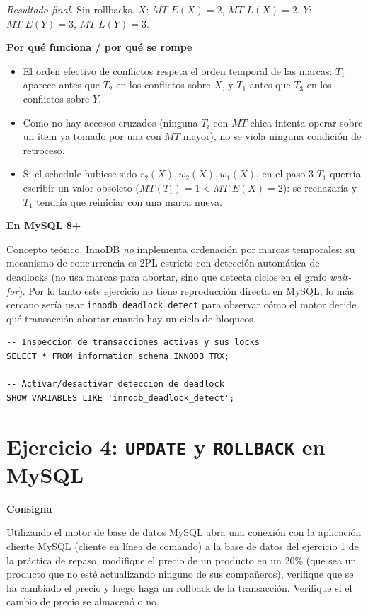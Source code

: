 \documentclass[11pt,a4paper]{article}
\newcommand{\itemcabecera}[1]{\noindent\textbf{#1}\par\medskip}
\newcommand{\bloqueConsigna}{\itemcabecera{Consigna}}
\newcommand{\bloquePorque}{\itemcabecera{Por qu\'e funciona / por qu\'e se rompe}}
\newcommand{\bloqueMySQL}{\itemcabecera{En MySQL 8+}}
\begin{document}
\textit{Resultado final.} Sin rollbacks. $X$: $MT\text{-}E(X) = 2$, $MT\text{-}L(X) = 2$. $Y$: $MT\text{-}E(Y) = 3$, $MT\text{-}L(Y) = 3$.

\bloquePorque

\begin{itemize}
    \item El orden efectivo de conflictos respeta el orden temporal de las marcas: $T_1$ aparece antes que $T_2$ en los conflictos sobre $X$, y $T_1$ antes que $T_3$ en los conflictos sobre $Y$.
    \item Como no hay accesos cruzados (ninguna $T_i$ con $MT$ chica intenta operar sobre un ítem ya tomado por una con $MT$ mayor), no se viola ninguna condición de retroceso.
    \item Si el schedule hubiese sido $r_2(X), w_2(X), w_1(X)$, en el paso 3 $T_1$ querría escribir un valor obsoleto ($MT(T_1)=1 < MT\text{-}E(X)=2$): se rechazaría y $T_1$ tendría que reiniciar con una marca nueva.
\end{itemize}

\bloqueMySQL

Concepto teórico. InnoDB \emph{no} implementa ordenación por marcas temporales: su mecanismo de concurrencia es 2PL estricto con detección automática de deadlocks (no usa marcas para abortar, sino que detecta ciclos en el grafo \emph{wait-for}). Por lo tanto este ejercicio no tiene reproducción directa en MySQL; lo más cercano sería usar \texttt{innodb\_deadlock\_detect} para observar cómo el motor decide qué transacción abortar cuando hay un ciclo de bloqueos.

\begin{lstlisting}
-- Inspeccion de transacciones activas y sus locks
SELECT * FROM information_schema.INNODB_TRX;

-- Activar/desactivar deteccion de deadlock
SHOW VARIABLES LIKE 'innodb_deadlock_detect';
\end{lstlisting}

\section{Ejercicio 4: \texttt{UPDATE} y \texttt{ROLLBACK} en MySQL}

\bloqueConsigna

Utilizando el motor de base de datos MySQL abra una conexión con la aplicación cliente MySQL (cliente en línea de comando) a la base de datos del ejercicio 1 de la práctica de repaso, modifique el precio de un producto en un 20\% (que sea un producto que no esté actualizando ninguno de sus compañeros), verifique que se ha cambiado el precio y luego haga un rollback de la transacción. Verifique si el cambio de precio se almacenó o no.
\end{document}
